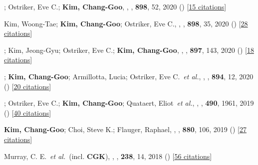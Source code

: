 \item[{22.}]; Ostriker, Eve C.; \textbf{Kim, Chang-Goo}, , \apj, \textbf{898}, 52, 2020 () [\href{http://adsabs.harvard.edu/abs/2020ApJ...898...52M}{15 citations}]

\item[{21.}]Kim, Woong-Tae; \textbf{Kim, Chang-Goo}; Ostriker, Eve C., , \apj, \textbf{898}, 35, 2020 () [\href{http://adsabs.harvard.edu/abs/2020ApJ...898...35K}{28 citations}]

\item[{20.}]; Kim, Jeong-Gyu; Ostriker, Eve C.; \textbf{Kim, Chang-Goo}, , \apj, \textbf{897}, 143, 2020 () [\href{http://adsabs.harvard.edu/abs/2020ApJ...897..143K}{18 citations}]

\item[{19.}]; \textbf{Kim, Chang-Goo}; Armillotta, Lucia; Ostriker, Eve C.~\textit{et al.}, , \apj, \textbf{894}, 12, 2020 () [\href{http://adsabs.harvard.edu/abs/2020ApJ...894...12V}{20 citations}]

\item[{18.}]; Ostriker, Eve C.; \textbf{Kim, Chang-Goo}; Quataert, Eliot~\textit{et al.}, , \mnras, \textbf{490}, 1961, 2019 () [\href{http://adsabs.harvard.edu/abs/2019MNRAS.490.1961E}{40 citations}]

\item[{17.}]\textbf{Kim, Chang-Goo}; Choi, Steve K.; Flauger, Raphael, , \apj, \textbf{880}, 106, 2019 () [\href{http://adsabs.harvard.edu/abs/2019ApJ...880..106K}{27 citations}]

\item[{16.}]Murray, C. E.~\textit{et al.}~(incl. \textbf{CGK}), , \apjs, \textbf{238}, 14, 2018 () [\href{http://adsabs.harvard.edu/abs/2018ApJS..238...14M}{56 citations}]

